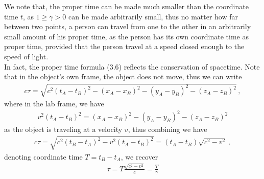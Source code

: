 \documentclass[11pt, onesided]{book}
\theoremstyle{break}
\theoremstyle{break}
\begin{document}
We note that, the proper time can be made much smaller than the coordinate time $t$, as $1\geq \gamma>0$ can be made arbitrarily small, thus no matter how far between two points, a person can travel from one to the other in an arbitrarily small amount of his proper time, as the person has its own coordinate time as proper time, provided that the person travel at a speed closed enough to the speed of light.\\

In fact, the proper time formula (3.6) reflects the conservation of spacetime. Note that in the object's own frame, the object does not move, thus we can write
\begin{align*}
c\tau = \sqrt{c^2 (t_A - t_B)^2 - (x_A - x_B)^2 - (y_A - y_B)^2 - (z_A - z_B)^2}\,,
\end{align*}
where in the lab frame, we have
\begin{align*}
v^2(t_A - t_B)^2 = (x_A - x_B)^2 - (y_A - y_B)^2 - (z_A - z_B)^2
\end{align*}
as the object is traveling at a velocity $v$, thus combining we have
\begin{align*}
c\tau = \sqrt{c^2 (t_B - t_A)^2 - v^2(t_A- t_B)^2} = (t_A - t_B)\sqrt{c^2 - v^2}\,,
\end{align*}
denoting coordinate time $T = t_B - t_A$, we recover
\begin{align*}
\tau = T \frac{\sqrt{c^2 - v^2}}{c} = \frac{T}{\gamma}
\end{align*}
\end{document}
